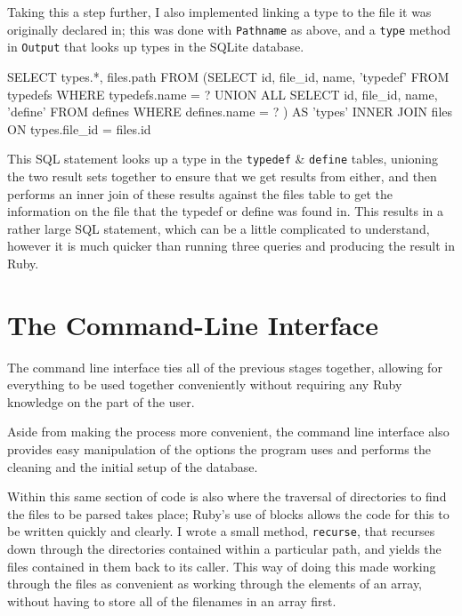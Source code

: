     Taking this a step further, I also implemented linking a type to the file it
    was originally declared in; this was done with \lstinline|Pathname| as
    above, and a \lstinline|type| method in \lstinline|Output| that looks up
    types in the SQLite database.

    \begin{code}[language=sql, gobble=6]
      SELECT types.*, files.path FROM
       (SELECT id, file_id, name, 'typedef' FROM typedefs WHERE typedefs.name = ?
        UNION ALL
        SELECT id, file_id, name, 'define' FROM defines WHERE defines.name = ?
       ) AS 'types' INNER JOIN files ON types.file_id = files.id
    \end{code}

    This SQL statement looks up a type in the \lstinline|typedef| \&
    \lstinline|define| tables, unioning the two result sets together to ensure
    that we get results from either, and then performs an inner join of these
    results against the files table to get the information on the file that the
    typedef or define was found in. This results in a rather large SQL
    statement, which can be a little complicated to understand, however it is
    much quicker than running three queries and producing the result in Ruby.

\section{The Command-Line Interface}
The command line interface ties all of the previous stages together, allowing
for everything to be used together conveniently without requiring any Ruby
knowledge on the part of the user.

Aside from making the process more convenient, the command line interface also
provides easy manipulation of the options the program uses and performs the
cleaning and the initial setup of the database.

Within this same section of code is also where the traversal of directories to
find the files to be parsed takes place; Ruby's use of blocks allows the code
for this to be written quickly and clearly. I wrote a small method,
\lstinline|recurse|, that recurses down through the directories contained within
a particular path, and yields the files contained in them back to its caller.
This way of doing this made working through the files as convenient as working
through the elements of an array, without having to store all of the filenames
in an array first.

